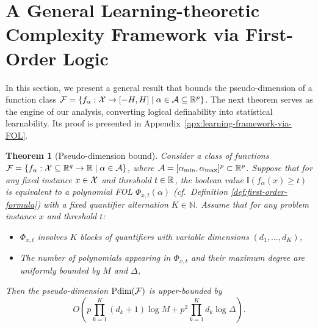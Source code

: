 \documentclass{article}
\theoremstyle{plain}
\newtheorem{theorem}{Theorem}[section]
\theoremstyle{definition}
\theoremstyle{remark}
\newcommand*{\NN}{\mathbb{N}}
\begin{document}
\section{A General Learning-theoretic Complexity Framework via First-Order Logic} \label{sec:learning-framework-via-FOL}
In this section, we present a general result that bounds the pseudo-dimension of a function class $\mathcal{F} = \{f_\alpha: \mathcal{X} \rightarrow [-H, H] \mid \alpha \in \mathcal{A} \subseteq \mathbb{R}^p\}$. The next theorem serves as the engine of our analysis, converting logical definability into statistical learnability. Its proof is presented in Appendix~\ref{apx:learning-framework-via-FOL}.

\begin{theorem}[Pseudo-dimension bound] \label{thm:upper-bound-pdim}
	Consider a class of functions $\mathcal{F} = \{f_\alpha: \mathcal{X} \subseteq \mathbb{R}^q \to \mathbb{R} \mid \alpha \in \mathcal{A}\}$, where $\mathcal{A} = [\alpha_\textup{min}, \alpha_\textup{max}]^p \subset \mathbb{R}^p$. Suppose that for any fixed instance $x \in \mathcal{X}$ and threshold $t \in \mathbb{R}$, the boolean value $\mathbb{I}(f_\alpha(x) \geq t)$ is equivalent to a polynomial FOL $\Phi_{x, t}(\alpha)$ (cf.~Definition \ref{def:first-order-formula}) with a fixed quantifier alternation $K \in \NN$. Assume that for any problem instance $x$ and threshold $t$: 
    \begin{itemize}[leftmargin=*]
        \item $\Phi_{x, t}$ involves $K$ blocks of quantifiers with variable dimensions $(d_1, \dots, d_K)$,
        \item The number of polynomials appearing in $\Phi_{x,t}$ and their maximum degree are uniformly bounded by $M$ and $\Delta$,
    \end{itemize}    
    Then the pseudo-dimension $\text{\normalfont Pdim}(\mathcal{F})$ is upper-bounded by
    \begin{equation*}
		O\left( p\prod_{k = 1}^K (d_k + 1) \log M + p^2 \prod_{k = 1}^K d_k \log \Delta\right).
	\end{equation*}
\end{theorem}
\end{document}
